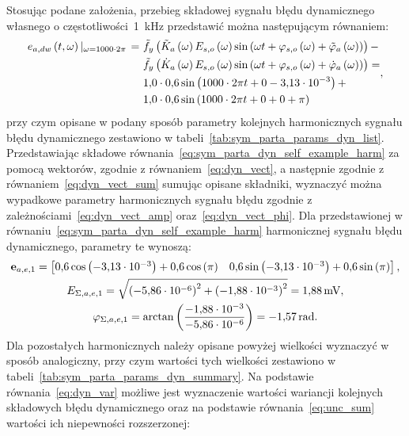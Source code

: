 Stosując podane założenia, przebieg składowej sygnału błędu dynamicznego własnego o częstotliwości~\qty{1}{kHz} przedstawić można następującym równaniem:
\begin{equation}
\begin{split}
e_{a,dw} \left(t,\omega\right) \left|_{\omega = 1000 \cdot 2 \pi } \right. =~
& \tilde{f}_{y} \left(\tilde{K}_{a} \left(\omega\right) E_{s,o} \left(\omega\right) \sin \left( \omega t + \varphi_{s,o} \left(\omega\right) + \tilde{\varphi}_{a} \left(\omega\right) \right)\right) - \\
& \tilde{f}_{y} \left(\dot{K}_{a} \left(\omega\right) E_{s,o} \left(\omega\right) \sin \left( \omega t + \varphi_{s,o} \left(\omega\right) + \dot{\varphi}_{a} \left(\omega\right) \right)\right) = \\
& \num{1.0} \cdot \num{0.6} \sin \left( 1000 \cdot 2 \pi t + 0 - \num{3.13e-3} \right) + \\
& \num{1.0} \cdot \num{0.6} \sin \left( 1000 \cdot 2 \pi t + 0 + 0 + \pi \right)
\end{split}
\label{eq:sym_parta_dyn_self_example_harm},
\end{equation}
przy czym opisane w podany sposób parametry kolejnych harmonicznych sygnału błędu dynamicznego zestawiono w tabeli~\ref{tab:sym_parta_params_dyn_list}. Przedstawiając składowe równania~\eqref{eq:sym_parta_dyn_self_example_harm} za pomocą wektorów, zgodnie z równaniem~\eqref{eq:dyn_vect}, a następnie zgodnie z równaniem~\eqref{eq:dyn_vect_sum} sumując opisane składniki, wyznaczyć można wypadkowe parametry harmonicznych sygnału błędu zgodnie z zależnościami~\eqref{eq:dyn_vect_amp} oraz~\eqref{eq:dyn_vect_phi}. Dla przedstawionej w równaniu~\eqref{eq:sym_parta_dyn_self_example_harm} harmonicznej sygnału błędu dynamicznego, parametry te wynoszą:
\begin{gather}
\mathbf{e}_{a,e,1} =
\begin{bmatrix}
\num{0.6} \cos \left(\num{-3.13e-3}\right) + \num{0.6} \cos \left(\pi\right) & \num{0.6} \sin \left(\num{-3.13e-3}\right) + \num{0.6} \sin \left(\pi\right)
\end{bmatrix}
\label{eq:sym_parta_dyn_self_example_sum}, \\
E_{\Sigma,a,e,1} = \sqrt{\left(\num{-5.86e-6}\right)^{2} + \left(\num{-1.88e-3}\right)^{2}} = \qty{1.88}{mV} \label{eq:sym_parta_dyn_self_example_amp}, \\
\varphi_{\Sigma,a,e,1} = \arctan \left(\frac{\num{-1.88e-3}}{\num{-5.86e-6}}\right) = \qty{-1.57}{rad} \label{eq:sym_parta_dyn_self_example_phi}.
\end{gather}
Dla pozostałych harmonicznych należy opisane powyżej wielkości wyznaczyć w sposób analogiczny, przy czym wartości tych wielkości zestawiono w tabeli~\ref{tab:sym_parta_params_dyn_summary}. Na podstawie równania~\eqref{eq:dyn_var} możliwe jest wyznaczenie wartości wariancji kolejnych składowych błędu dynamicznego oraz na podstawie równania~\eqref{eq:unc_sum} wartości ich niepewności rozszerzonej:
